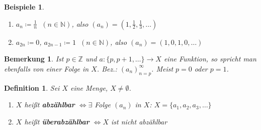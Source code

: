 \documentclass[titlepage,ngerman,a4paper,headsepline,DIV15,halfparskip*,14pt]{scrartcl}
\newcommand{\Z}{\mathbb{Z}}
\newcommand{\N}{\mathbb{N}}
\theoremstyle{dotless}
\newtheorem*{definition}{Definition}
\newtheorem*{beispiele}{Beispiele}
\newtheorem*{bemerkung}{Bemerkung}
\begin{document}
\begin{beispiele} ~\
	\begin{enumerate}
		\item $a_{n} \coloneqq \frac{1}{n}$ $~(n \in \N)$, also $(a_{n}) = (1, \frac{1}{2}, \frac{1}{3}, \dotsc)$
		\item $a_{2n} \coloneqq 0$, $a_{2n-1} \coloneqq 1$ $~(n \in \N)$, also $(a_{n}) = (1, 0, 1, 0, \dotsc)$
	\end{enumerate}
\end{beispiele}


\begin{bemerkung}
	Ist $p \in \Z$ und $a \colon \{ p, p + 1, \dotsc \} \to X$ eine Funktion, so spricht man ebenfalls von einer Folge in $X$. Bez.: $(a_{n})_{n = p}^{\infty}$. Meist $p = 0$ oder $p = 1$.
\end{bemerkung}

 
\begin{definition}
	Sei $X$ eine Menge, $X \neq \emptyset$.
	\begin{enumerate}
		\item $X$ hei{\ss}t \textbf{abzählbar} $\iff \exists$ Folge $(a_{n})$ in $X$: $X = \{ a_{1}, a_{2}, a_{3}, \dotsc \}$
		\item $X$ hei{\ss}t \textbf{überabzählbar} $\iff X$ ist nicht abzählbar
	\end{enumerate}
\end{definition}
\end{document}
